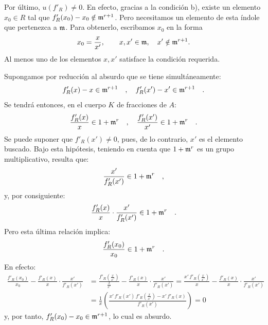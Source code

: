 Por último, $u(f'_R)\ne0$. En efecto, gracias a la condición b), existe un elemento $x_0\in R$ tal que $f'_R(x_0)-x_0\notin\mathfrak m^{r+1}$. Pero necesitamos un elemento de esta índole que pertenezca a $\mathfrak m$. Para obtenerlo, escribamos $x_0$ en la forma
\[
x_0=\frac{x}{x'},\qquad x,x'\in\mathfrak m,\quad x'\notin\mathfrak m^{r+1}.
\]
Al menos uno de los elementos $x,x'$ satisface la condición requerida.

Supongamos por reducción al absurdo que se tiene simultáneamente:
\[
f'_R(x) - x \in \mathfrak m^{r+1} \quad , \quad f'_R(x') - x' \in \mathfrak m^{r+1} \quad .
\]
Se tendrá entonces, en el cuerpo $K$ de fracciones de $A$:%
\[
\frac{f'_R(x)}{x} \in 1 + \mathfrak m^r \quad , \quad \frac{f'_R(x')}{x'} \in 1 + \mathfrak m^r \quad .
\]
Se puede suponer que $f'_R(x') \neq 0$, pues, de lo contrario, $x'$ es el elemento buscado. Bajo esta hipótesis, teniendo en cuenta que $1 + \mathfrak m^r$ es un grupo multiplicativo, resulta que:
\[
\frac{x'}{f'_R(x')} \in 1 + \mathfrak m^r \quad ,
\]
y, por consiguiente:
\[
\frac{f'_R(x)}{x} \cdot \frac{x'}{f'_R(x')} \in 1 + \mathfrak m^r \quad .
\]
Pero esta última relación implica:
\[
\frac{f'_R(x_0)}{x_0} \in 1 + \mathfrak m^r \quad .
\]
En efecto:
\[
\begin{aligned}
\frac{f'_R(x_0)}{x_0} - \frac{f'_R(x)}{x} \cdot \frac{x'}{f'_R(x')}
&= \frac{f'_R(\frac{x}{x'})}{\frac{x}{x'}} - \frac{f'_R(x)}{x} \cdot \frac{x'}{f'_R(x')}
= \frac{x'\,f'_R(\frac{x}{x'})}{x} - \frac{f'_R(x)}{x} \cdot \frac{x'}{f'_R(x')} \\
&= \frac{1}{x}\left(\frac{x'\,f'_R(x')\,f'_R(\frac{x}{x'}) - x'\,f'_R(x)}{f'_R(x')}\right) = 0
\end{aligned}
\]
y, por tanto, $f'_R(x_0) - x_0 \in \mathfrak m^{r+1}$, lo cual es absurdo.%
